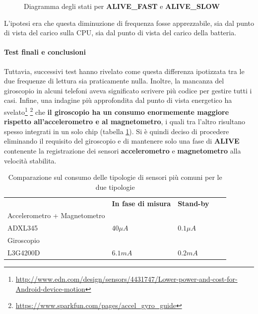 \documentclass[a4paper,10pt]{memoir}
\begin{document}
\begin{figure}[ht]
\centering
\caption{Diagramma degli stati per \textbf{ALIVE\_FAST} e \textbf{ALIVE\_SLOW}}
\label{fig:scs_sm4}
\end{figure}

L'ipotesi era che questa diminuzione di frequenza fosse apprezzabile, sia dal punto di vista del carico sulla CPU, sia dal punto di vista del carico della batteria.

\paragraph{Test finali e conclusioni} Tuttavia, successivi test hanno rivelato come questa differenza ipotizzata tra le due frequenze di lettura sia praticamente nulla. Inoltre, la mancanza del giroscopio in alcuni telefoni aveva significato scrivere più codice per gestire tutti i casi. Infine, una indagine più approfondita dal punto di vista energetico ha svelato\footnote{\url{http://www.edn.com/design/sensors/4431747/Lower-power-and-cost-for-Android-device-motion}} \footnote{\url{https://www.sparkfun.com/pages/accel_gyro_guide}} che \textbf{il giroscopio ha un consumo enormemente maggiore rispetto all'accelerometro e al magnetometro}, i quali tra l'altro risultano spesso integrati in un solo chip (tabella \ref{table:consumosensori}). Si è quindi deciso di procedere eliminando il requisito del giroscopio e di mantenere solo una fase di \textbf{ALIVE} contenente la registrazione dei sensori \textbf{accelerometro} e \textbf{magnetometro} alla velocità stabilita.

\begin{table}[h]
\centering
\caption{Comparazione sul consumo delle tipologie di sensori più comuni per le due tipologie}
\label{table:consumosensori}
\begin{tabular}{lllll}
& \textbf{In fase di misura} & \textbf{Stand-by} & \\
Accelerometro + Magnetometro \\
ADXL345\cite{accelman} & $40 \mu A$ & $0.1 \mu A$ &  \\
Giroscopio \\
L3G4200D\cite{gyroman} & $6.1mA$ & $0.2mA$ &
\end{tabular}
\end{table}
\end{document}
